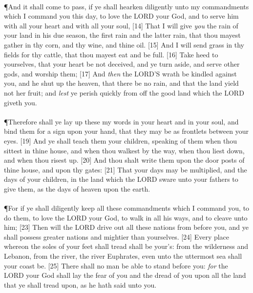 \\
\P  \textcolor[rgb]{0.00,0.00,1.00}{And it shall come to pass, if ye shall hearken diligently unto my commandments which I command you this day, to love the LORD your God, and to serve him with all your heart and with all your soul,}
[14] \textcolor[rgb]{0.00,0.00,1.00}{That I will give \emph{you} the rain of your land in his due season, the first rain and the latter rain, that thou mayest gather in thy corn, and thy wine, and thine oil.}
[15] \textcolor[rgb]{0.00,0.00,1.00}{And I will send grass in thy fields for thy cattle, that thou mayest eat and be full.}
[16] \textcolor[rgb]{0.00,0.00,1.00}{Take heed to yourselves, that your heart be not deceived, and ye turn aside, and serve other gods, and worship them;}
[17] \textcolor[rgb]{0.00,0.00,1.00}{And \emph{then} the LORD'S wrath be kindled against you, and he shut up the heaven, that there be no rain, and that the land yield not her fruit; and \emph{lest} ye perish quickly from off the good land which the LORD giveth you.}\\
\\
\P \textcolor[rgb]{0.00,0.00,1.00}{Therefore shall ye lay up these my words in your heart and in your soul, and bind them for a sign upon your hand, that they may be as frontlets between your eyes.}
[19] \textcolor[rgb]{0.00,0.00,1.00}{And ye shall teach them your children, speaking of them when thou sittest in thine house, and when thou walkest by the way, when thou liest down, and when thou risest up.}
[20] \textcolor[rgb]{0.00,0.00,1.00}{And thou shalt write them upon the door posts of thine house, and upon thy gates:}
[21] \textcolor[rgb]{0.00,0.00,1.00}{That your days may be multiplied, and the days of your children, in the land which the LORD sware unto your fathers to give them, as the days of heaven upon the earth.}\\
\\
\P \textcolor[rgb]{0.00,0.00,1.00}{For if ye shall diligently keep all these commandments which I command you, to do them, to love the LORD your God, to walk in all his ways, and to cleave unto him;}
[23] \textcolor[rgb]{0.00,0.00,1.00}{Then will the LORD drive out all these nations from before you, and ye shall possess greater nations and mightier than yourselves.}
[24] \textcolor[rgb]{0.00,0.00,1.00}{Every place whereon the soles of your feet shall tread shall be your's: from the wilderness and Lebanon, from the river, the river Euphrates, even unto the uttermost sea shall your coast be.}
[25] \textcolor[rgb]{0.00,0.00,1.00}{There shall no man be able to stand before you: \emph{for} the LORD your God shall lay the fear of you and the dread of you upon all the land that ye shall tread upon, as he hath said unto you.}\\
